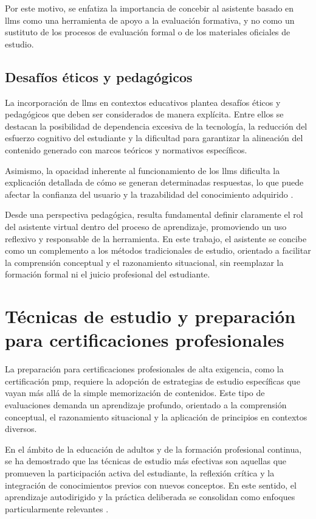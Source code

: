 Por este motivo, se enfatiza la importancia de concebir al asistente basado en \glspl{llm} como una herramienta de apoyo a la evaluación formativa, y no como un sustituto de los procesos de evaluación formal o de los materiales oficiales de estudio.

\subsection{Desafíos éticos y pedagógicos}

La incorporación de \glspl{llm} en contextos educativos plantea desafíos éticos y pedagógicos que deben ser considerados de manera explícita. Entre ellos se destacan la posibilidad de dependencia excesiva de la tecnología, la reducción del esfuerzo cognitivo del estudiante y la dificultad para garantizar la alineación del contenido generado con marcos teóricos y normativos específicos.

Asimismo, la opacidad inherente al funcionamiento de los \glspl{llm} dificulta la explicación detallada de cómo se generan determinadas respuestas, lo que puede afectar la confianza del usuario y la trazabilidad del conocimiento adquirido \parencite{gallegos2024bias}.

Desde una perspectiva pedagógica, resulta fundamental definir claramente el rol del asistente virtual dentro del proceso de aprendizaje, promoviendo un uso reflexivo y responsable de la herramienta. En este trabajo, el asistente se concibe como un complemento a los métodos tradicionales de estudio, orientado a facilitar la comprensión conceptual y el razonamiento situacional, sin reemplazar la formación formal ni el juicio profesional del estudiante.

\section{Técnicas de estudio y preparación para certificaciones profesionales}

La preparación para certificaciones profesionales de alta exigencia, como la certificación \gls{pmp}, requiere la adopción de estrategias de estudio específicas que vayan más allá de la simple memorización de contenidos. Este tipo de evaluaciones demanda un aprendizaje profundo, orientado a la comprensión conceptual, el razonamiento situacional y la aplicación de principios en contextos diversos.

En el ámbito de la educación de adultos y de la formación profesional continua, se ha demostrado que las técnicas de estudio más efectivas son aquellas que promueven la participación activa del estudiante, la reflexión crítica y la integración de conocimientos previos con nuevos conceptos. En este sentido, el aprendizaje autodirigido y la práctica deliberada se consolidan como enfoques particularmente relevantes \parencite{stclair2024andragogy}.

